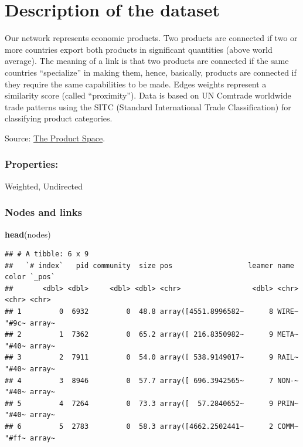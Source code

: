 \documentclass[
]{article}
\newenvironment{Shaded}{\begin{snugshade}}{\end{snugshade}}
\newcommand{\FunctionTok}[1]{\textcolor[rgb]{0.13,0.29,0.53}{\textbf{#1}}}
\newcommand{\NormalTok}[1]{#1}
\begin{document}
\section{Description of the dataset}\label{description-of-the-dataset}

Our network represents economic products. Two products are connected if
two or more countries export both products in significant quantities
(above world average). The meaning of a link is that two products are
connected if the same countries ``specialize'' in making them, hence,
basically, products are connected if they require the same capabilities
to be made. Edges weights represent a similarity score (called
``proximity''). Data is based on UN Comtrade worldwide trade patterns
using the SITC (Standard International Trade Classification) for
classifying product categories.

Source: \href{https://www.michelecoscia.com/?page_id=223}{The Product
Space}.

\subsubsection{Properties:}\label{properties}

Weighted, Undirected

\subsubsection{Nodes and links}\label{nodes-and-links}

\begin{Shaded}
\begin{Highlighting}[]
\FunctionTok{head}\NormalTok{(nodes)}
\end{Highlighting}
\end{Shaded}

\begin{verbatim}
## # A tibble: 6 x 9
##   `# index`   pid community  size pos                  leamer name  color `_pos`
##       <dbl> <dbl>     <dbl> <dbl> <chr>                 <dbl> <chr> <chr> <chr> 
## 1         0  6932         0  48.8 array([4551.8996582~      8 WIRE~ "#9c~ array~
## 2         1  7362         0  65.2 array([ 216.8350982~      9 META~ "#40~ array~
## 3         2  7911         0  54.0 array([ 538.9149017~      9 RAIL~ "#40~ array~
## 4         3  8946         0  57.7 array([ 696.3942565~      7 NON-~ "#40~ array~
## 5         4  7264         0  73.3 array([  57.2840652~      9 PRIN~ "#40~ array~
## 6         5  2783         0  58.3 array([4662.2502441~      2 COMM~ "#ff~ array~
\end{verbatim}
\end{document}
